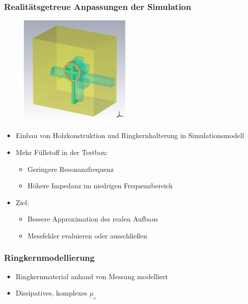 \documentclass[accentcolor=tud9b, colorbacktitle, inverttitle]{tudbeamer}
\begin{document}
\begin{frame}\frametitle{Realit\"atsgetreue Anpassungen der Simulation}
\vspace{-1em}
\begin{multicols}{2}
\begin{figure}[h]
	\centering
	\includegraphics[width=0.48\textwidth]{KreuzPolygon}
\end{figure}
\vfill\null
\columnbreak
\begin{itemize}
	\item Einbau von Holzkonstruktion und Ringkernhalterung in Simulationsmodell
	\item Mehr F\"ullstoff in der Testbox:
	\begin{itemize}
		\item Geringere Resonanzfrequenz
		\item H\"ohere Impedanz im niedrigen Frequenzbereich
	\end{itemize}
	\item Ziel:
	\begin{itemize}
		\item Bessere Approximation des realen Aufbaus
		\item Messfehler evaluieren oder ausschlie\ss{}en
	\end{itemize}
\end{itemize}
\vfill\null
\end{multicols}
\end{frame}


\begin{frame}\frametitle{Ringkernmodellierung}
\begin{itemize}
	\item Ringkernmaterial anhand von Messung modelliert
	\item Dissipatives, komplexes $\underline{\mu}_r $
\end{itemize}
\end{frame}
\end{document}
